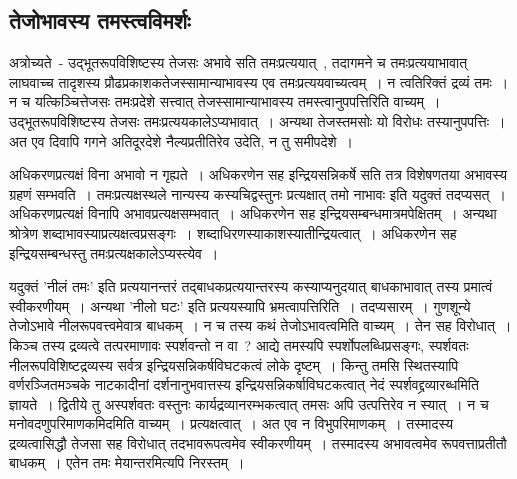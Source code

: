 		\subsection{तेजोभावस्य तमस्त्वविमर्शः}

		अत्रोच्यते~- उद्भूतरूपविशिष्टस्य तेजसः अभावे सति तमःप्रत्ययात्~, तदागमने च तमःप्रत्ययाभावात् लाघवाच्च तादृशस्य प्रौढप्रकाशकतेजस्सामान्याभावस्य एव तमःप्रत्ययवाच्यत्वम्~। न त्वतिरिक्तं द्रव्यं तमः~। न च यत्किञ्चित्तेजसः तमःप्रदेशे सत्त्वात् तेजस्सामान्याभावस्य तमस्त्वानुपपत्तिरिति वाच्यम्~। उद्भूतरूपविशिष्टस्य तेजसः तमःप्रत्ययकालेऽप्यभावात्~। अन्यथा तेजस्तमसोः यो विरोधः तस्यानुपपत्तिः~। अत एव दिवापि गगने अतिदूरदेशे नैल्यप्रतीतिरेव उदेति, न तु समीपदेशे~। 
		 
		अधिकरणप्रत्यक्षं विना अभावो न गृह्यते~। अधिकरणेन सह इन्द्रियसन्निकर्षे सति तत्र विशेषणतया अभावस्य ग्रहणं सम्भवति~। तमःप्रत्यक्षस्थले नान्यस्य कस्यचिद्वस्तुनः प्रत्यक्षात् तमो नाभावः इति यदुक्तं तदप्यसत्~। अधिकरणप्रत्यक्षं विनापि अभावप्रत्यक्षसम्भवात्~। अधिकरणेन सह इन्द्रियसम्बन्धमात्रमपेक्षितम्~। अन्यथा श्रोत्रेण शब्दाभावस्याप्रत्यक्षत्वप्रसङ्गः~। शब्दाधिरणस्याकाशस्यातीन्द्रियत्वात्~। अधिकरणेन सह इन्द्रियसम्बन्धस्तु तमःप्रत्यक्षकालेऽप्यस्त्येव~।

		यदुक्तं 'नीलं तमः' इति प्रत्ययानन्तरं तद्बाधकप्रत्ययान्तरस्य कस्याप्यनुदयात् बाधकाभावात् तस्य प्रमात्वं स्वीकरणीयम्~। अन्यथा 'नीलो घटः' इति प्रत्ययस्यापि भ्रमत्वापत्तिरिति~। तदप्यसारम्~। गुणशून्ये तेजोऽभावे नीलरूपवत्त्वमेवात्र बाधकम्~। न च तस्य कथं तेजोऽभावत्वमिति वाच्यम्~। तेन सह विरोधात्~। किञ्च तस्य द्रव्यत्वे तत्परमाणावः स्पर्शवन्तो न वा~? आद्ये तमस्यपि स्पर्शोपलब्धिप्रसङ्गः, स्पर्शवतः नीलरूपविशिष्टद्रव्यस्य सर्वत्र इन्द्रियसन्निकर्षविघटकत्वं लोके दृष्टम्~। किन्तु तमसि स्थितस्यापि वर्णरञ्जितमञ्चके नाटकादीनां दर्शनानुभवात्तस्य इन्द्रियसन्निकर्षाविघटकत्वात् नेदं स्पर्शवद्द्रव्यारब्धमिति ज्ञायते~। द्वितीये तु अस्पर्शवतः वस्तुनः कार्यद्रव्यानरम्भकत्वात् तमसः अपि उत्पत्तिरेव न स्यात्~। न च मनोवदणुपरिमाणकमिदमिति वाच्यम्~। प्रत्यक्षत्वात्~। अत एव न विभुपरिमाणकम्~। तस्मादस्य द्रव्यत्वासिद्धौ तेजसा सह विरोधात् तदभावरूपत्वमेव स्वीकरणीयम्~। तस्मादस्य अभावत्वमेव रूपवत्ताप्रतीतौ बाधकम्~। एतेन तमः मेयान्तरमित्यपि निरस्तम्~।

